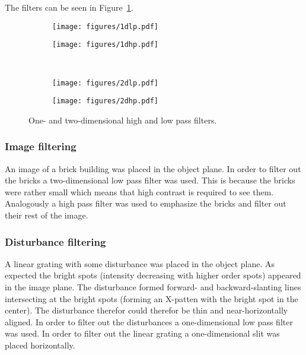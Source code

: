 \documentclass[12pt,a4paper]{article}
\begin{document}
The filters can be seen in Figure~\ref{fig:filters}.
\begin{figure}
  \centering
  \begin{subfigure}[b]{0.45\textwidth}
    \texttt{[image: figures/1dlp.pdf]}
  \end{subfigure}
  \begin{subfigure}[b]{0.45\textwidth}
    \texttt{[image: figures/1dhp.pdf]}
  \end{subfigure}\\
  \begin{subfigure}[b]{0.45\textwidth}
    \texttt{[image: figures/2dlp.pdf]}
  \end{subfigure}
  \begin{subfigure}[b]{0.45\textwidth}
    \texttt{[image: figures/2dhp.pdf]}
  \end{subfigure}
  \caption{One- and two-dimensional high and low pass filters.}
  \label{fig:filters}
\end{figure}

\subsubsection{Image filtering}
An image of a brick building was placed in the object plane. In order to filter out the bricks a two-dimensional low pass filter was used. This is because the bricks were rather small which means that high contrast is required to see them. Analogously a high pass filter was used to emphasize the bricks and filter out their rest of the image.

\subsubsection{Disturbance filtering}
A linear grating with some disturbance was placed in the object plane. As expected the bright spots (intensity decreasing with higher order spots) appeared in the image plane. The disturbance formed forward- and backward-slanting lines intersecting at the bright spots (forming an X-patten with the bright spot in the center). The disturbance  therefor could therefor be thin and near-horizontally aligned.
In order to filter out the disturbances a one-dimensional low pass filter was used.
In order to filter out the linear grating a one-dimensional slit was placed horizontally.
\end{document}
